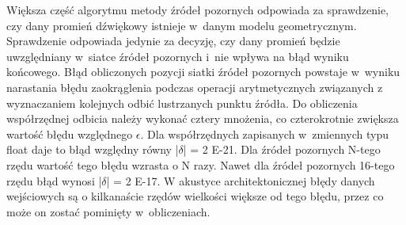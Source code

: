Większa część algorytmu metody źródeł pozornych odpowiada za sprawdzenie, czy dany promień dźwiękowy istnieje w~danym modelu geometrycznym. Sprawdzenie odpowiada jedynie za decyzję, czy dany promień będzie uwzględniany w~siatce źródeł pozornych i~nie wpływa na błąd wyniku końcowego. Błąd obliczonych pozycji siatki źródeł pozornych powstaje w~wyniku narastania błędu zaokrąglenia podczas operacji arytmetycznych związanych z wyznaczaniem kolejnych odbić lustrzanych punktu źródła. Do obliczenia współrzędnej odbicia należy wykonać cztery mnożenia, co czterokrotnie zwiększa wartość błędu względnego $\epsilon$. Dla współrzędnych zapisanych w~zmiennych typu float daje to błąd względny równy |$\delta$| = 2 E-21. Dla źródeł pozornych N-tego rzędu wartość tego błędu wzrasta o N razy. Nawet dla źródeł pozornych 16-tego rzędu błąd wynosi |$\delta$| = 2 E-17. W akustyce architektonicznej błędy danych wejściowych są o kilkanaście rzędów wielkości większe od tego błędu, przez co może on zostać pominięty w~obliczeniach.\\








